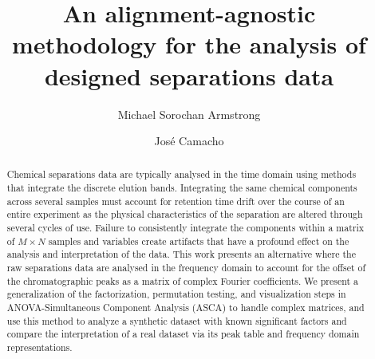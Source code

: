 \documentclass[preprint,12pt]{elsarticle}
\begin{document}
\begin{frontmatter}



\title{An alignment-agnostic methodology for the analysis of designed separations data}


\author{Michael Sorochan Armstrong}
\author{Jos\'e Camacho}
\address{Computational Data Science (CoDaS) Lab, Department of Signal Theory, Networks and Communication - University of Granada,%
            C/ Periodista Daniel Saucedo Aranda, 
            Granada,
            18071, 
            Andalusia,
            Spain}
\begin{abstract}
Chemical separations data are typically analysed in the time domain using methods that integrate the discrete elution bands. Integrating the same chemical components across several samples must account for retention time drift over the course of an entire experiment as the physical characteristics of the separation are altered through several cycles of use. Failure to consistently integrate the components within a matrix of $M \times N$ samples and variables create artifacts that have a profound effect on the analysis and interpretation of the data. This work presents an alternative where the raw separations data are analysed in the frequency domain to account for the offset of the chromatographic peaks as a matrix of complex Fourier coefficients. We present a generalization of the factorization, permutation testing, and visualization steps in ANOVA-Simultaneous Component Analysis (ASCA) to handle complex matrices, and use this method to analyze a synthetic dataset with known significant factors and compare the interpretation of a real dataset via its peak table and frequency domain representations.


\end{abstract}
\end{frontmatter}
\end{document}
